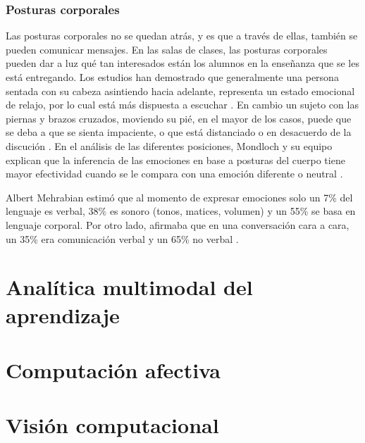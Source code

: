 \subsubsection{Posturas corporales}
Las posturas corporales no se quedan atr\'as, y es que a trav\'es de ellas, tambi\'en se pueden comunicar mensajes. En las salas de clases, las posturas corporales pueden dar a luz qu\'e tan interesados est\'an los alumnos en la ense\~nanza que se les est\'a entregando. 
Los estudios han demostrado que generalmente una persona sentada con su cabeza asintiendo hacia adelante, representa un estado emocional de relajo, por lo cual est\'a m\'as dispuesta a escuchar \cite{KurienBodyLanguage}. En cambio un sujeto con las piernas y brazos cruzados, moviendo su pi\'e, en el mayor de los casos, puede que se deba a que se sienta impaciente, o que est\'a distanciado o en desacuerdo de la discuci\'on \cite{KurienBodyLanguage}.
En el an\'alisis de las diferentes posiciones, Mondloch y su equipo explican que la inferencia de las emociones en base a posturas del cuerpo tiene mayor efectividad cuando se le compara con una emoci\'on diferente o neutral \cite{MondlochRelacionPosturasYGestos}.





Albert Mehrabian estim\'o que al momento de expresar emociones solo un 7\% del lenguaje es verbal, 38\% es sonoro (tonos, matices, volumen) y un 55\% se basa en lenguaje corporal. Por otro lado, afirmaba que en una conversaci\'on cara a cara, un 35\% era comunicaci\'on verbal y un 65\% no verbal \cite{MehrabianNonVerbalCommunication}.

\section{Anal\'itica multimodal del aprendizaje}
\section{Computaci\'on afectiva}
\section{Visi\'on computacional}






